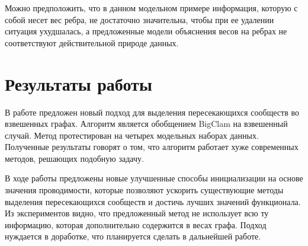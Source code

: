 \documentclass{ITaSconf}
\begin{document}
	Можно предположить, что в данном модельном примере информация, которую с собой несет вес ребра, не достаточно значительна, чтобы при ее удалении ситуация ухудшалась, а предложенные модели объяснения весов на ребрах не соответствуют действительной природе данных.
	
	\section{Результаты работы}
	
	В работе предложен новый подход для выделения пересекающихся сообществ во взвешенных графах. 
	Алгоритм является обобщением BigClam на взвешенный случай.
	Метод протестирован на четырех модельных наборах данных. 
	Полученные результаты говорят о том, что алгоритм работает хуже современных методов, решающих подобную задачу. 
	
	В ходе работы предложены новые улучшенные способы инициализации на основе значения проводимости, которые позволяют ускорить существующие методы выделения пересекающихся сообществ и достичь лучших значений функционала.
	Из экспериментов видно, что предложенный метод не использует всю ту информацию, которая дополнительно содержится в весах графа. 
	Подход нуждается в доработке, что планируется сделать в дальнейшей работе.
	
	
	
	
\end{document}

